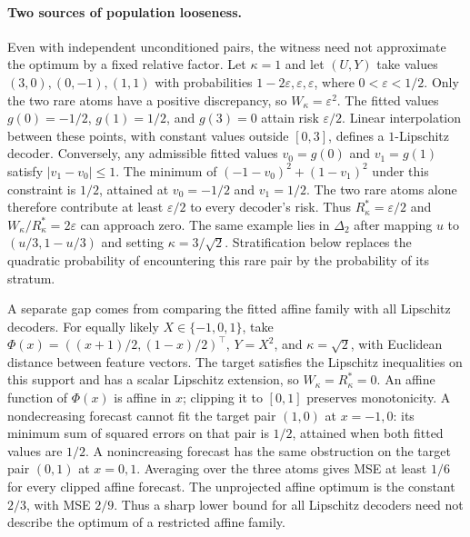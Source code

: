 \paragraph{Two sources of population looseness.}
Even with independent unconditioned pairs, the witness need not approximate
the optimum by a fixed relative factor. Let $\kappa=1$ and let $(U,Y)$
take values $(3,0),(0,-1),(1,1)$ with probabilities
$1-2\varepsilon,\varepsilon,\varepsilon$, where
$0<\varepsilon<1/2$. Only the two rare atoms have a positive discrepancy,
so $W_\kappa=\varepsilon^2$. The fitted values
$g(0)=-1/2$, $g(1)=1/2$, and $g(3)=0$ attain risk $\varepsilon/2$.
Linear interpolation between these points, with constant values outside
$[0,3]$, defines a $1$-Lipschitz decoder. Conversely, any admissible fitted
values $v_0=g(0)$ and $v_1=g(1)$ satisfy $|v_1-v_0|\leq1$.
The minimum of $(-1-v_0)^2+(1-v_1)^2$ under this constraint is $1/2$,
attained at $v_0=-1/2$ and $v_1=1/2$. The two rare atoms alone therefore
contribute at least $\varepsilon/2$ to every decoder's risk. Thus
$R^*_\kappa=\varepsilon/2$ and
$W_\kappa/R^*_\kappa=2\varepsilon$ can approach zero. The same example
lies in $\Delta_2$ after mapping $u$ to $(u/3,1-u/3)$ and setting
$\kappa=3/\sqrt2$. Stratification below replaces the quadratic probability
of encountering this rare pair by the probability of its stratum.

A separate gap comes from comparing the fitted affine family with all
Lipschitz decoders. For equally likely $X\in\{-1,0,1\}$, take
$\Phi(x)=((x+1)/2,(1-x)/2)^\top$, $Y=X^2$, and $\kappa=\sqrt2$,
with Euclidean distance between feature vectors.
The target satisfies the Lipschitz inequalities on this support and has a
scalar Lipschitz extension, so $W_\kappa=R^*_\kappa=0$.
An affine function of $\Phi(x)$ is affine in $x$; clipping it to $[0,1]$
preserves monotonicity. A nondecreasing forecast cannot fit the target pair
$(1,0)$ at $x=-1,0$: its minimum sum of squared errors on that pair is
$1/2$, attained when both fitted values are $1/2$. A nonincreasing forecast
has the same obstruction on the target pair $(0,1)$ at $x=0,1$.
Averaging over the three atoms gives MSE at least $1/6$ for every clipped
affine forecast. The unprojected affine optimum is the constant $2/3$,
with MSE $2/9$. Thus a sharp lower bound for all Lipschitz decoders need
not describe the optimum of a restricted affine family.
